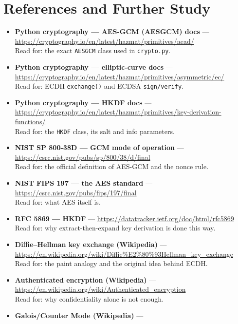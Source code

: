\documentclass[11pt,a4paper]{report}
\begin{document}
\section{References and Further Study}
\begin{itemize}
  \item \textbf{Python cryptography --- AES-GCM (AESGCM) docs} ---
        \url{https://cryptography.io/en/latest/hazmat/primitives/aead/}\\
        Read for: the exact \texttt{AESGCM} class used in \texttt{crypto.py}.
  \item \textbf{Python cryptography --- elliptic-curve docs} ---
        \url{https://cryptography.io/en/latest/hazmat/primitives/asymmetric/ec/}\\
        Read for: ECDH \texttt{exchange()} and ECDSA \texttt{sign/verify}.
  \item \textbf{Python cryptography --- HKDF docs} ---
        \url{https://cryptography.io/en/latest/hazmat/primitives/key-derivation-functions/}\\
        Read for: the \texttt{HKDF} class, its salt and info parameters.
  \item \textbf{NIST SP 800-38D --- GCM mode of operation} ---
        \url{https://csrc.nist.gov/pubs/sp/800/38/d/final}\\
        Read for: the official definition of AES-GCM and the nonce rule.
  \item \textbf{NIST FIPS 197 --- the AES standard} ---
        \url{https://csrc.nist.gov/pubs/fips/197/final}\\
        Read for: what AES itself is.
  \item \textbf{RFC 5869 --- HKDF} ---
        \url{https://datatracker.ietf.org/doc/html/rfc5869}\\
        Read for: why extract-then-expand key derivation is done this way.
  \item \textbf{Diffie--Hellman key exchange (Wikipedia)} ---
        \url{https://en.wikipedia.org/wiki/Diffie%E2%80%93Hellman_key_exchange}\\
        Read for: the paint analogy and the original idea behind ECDH.
  \item \textbf{Authenticated encryption (Wikipedia)} ---
        \url{https://en.wikipedia.org/wiki/Authenticated_encryption}\\
        Read for: why confidentiality alone is not enough.
  \item \textbf{Galois/Counter Mode (Wikipedia)} ---

\end{itemize}
\end{document}
